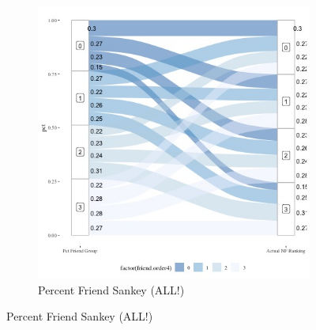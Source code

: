 \documentclass[12pt,letterpaper]{article}
\begin{document}
\begin{figure}[ht]
\begin{subfigure}{.5\textwidth}
        \includegraphics[width=1\linewidth]{Output/Graphs/Audit/Sankey flows/US PYMK pct friend to actual.jpg}  
        \caption{Percent Friend Sankey (ALL!)}
        \label{fig:sub-second}
    \end{subfigure}


\end{figure}
\end{document}
